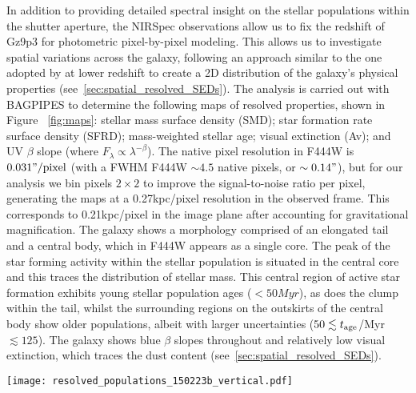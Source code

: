 \documentclass[sn-mathphys]{sn-jnl}%
\theoremstyle{thmstyleone}%
\theoremstyle{thmstyletwo}%
\theoremstyle{thmstylethree}%
\begin{document}
In addition to providing detailed spectral insight on the stellar populations within the shutter aperture, the NIRSpec observations allow us to fix the redshift of Gz9p3 for photometric pixel-by-pixel modeling. This allows us to investigate spatial variations across the galaxy, following an approach similar to the one adopted by \cite{Gimenez-Arteaga22} at lower redshift to create a 2D distribution of the galaxy's physical properties (see~\ref{sec:spatial_resolved_SEDs}). The analysis is carried out with BAGPIPES \cite{Carnall18} to determine the following maps of resolved properties, shown in Figure ~\ref{fig:maps}: stellar mass surface density (SMD); star formation rate surface density (SFRD); mass-weighted stellar age; visual extinction (Av); and UV $\beta$ slope (where $F_\lambda \propto \lambda^{-\beta}$).
The native pixel resolution in F444W is $0.031\mathrm{"/pixel}$ (with a FWHM F444W $\sim4.5$ native pixels, or $\sim0.14"$), but for our analysis we bin pixels $2\times2$ to improve the signal-to-noise ratio per pixel, generating the maps at a 0.27kpc/pixel resolution in the observed frame. This corresponds to 0.21kpc/pixel in the image plane after accounting for gravitational magnification. The galaxy shows a morphology comprised of an elongated tail and a central body, which in F444W appears as a single core.
The peak of the star forming activity within the stellar population is situated in the central core and this traces the distribution of stellar mass. This central region of active star formation exhibits young stellar population ages ($<50Myr$), as does the clump within the tail, whilst the surrounding regions on the outskirts of the central body show older populations, albeit with larger uncertainties ($50 \lesssim t_{\rm age}$/Myr $\lesssim 125$). The galaxy shows blue $\beta$ slopes throughout and relatively low visual extinction, which traces the dust content (see~\ref{sec:spatial_resolved_SEDs}). 


\begin{figure*}
    \centering
    \texttt{[image: resolved\_populations\_150223b\_vertical.pdf]}
    \caption{2D distribution of color and physical parameters inferred from photometric spectral energy distribution fitting (NIRCam pixels matched to F444W and binned 2x2), with an observed frame resolution of 0.27kpc/pixel (0.21kpc/pixel in the image plane). 
    From left to right: the top and second row present the star formation rate surface density, stellar age, and stellar mass surface density. The third and bottom row present the color, visual extinction and UV $\beta$ slope.  (Upper panels: Median value, Lower panels: Uncertainty based on 16$^{th}$ and 84$^{th}$ percentiles).
    The F150W $10\sigma$ contour is presented in orange in the F150W-F444W panel and the FWHM and pixel-scale are shown in the F356W-F444W panel.}
    \label{fig:maps}
\end{figure*}
\end{document}
